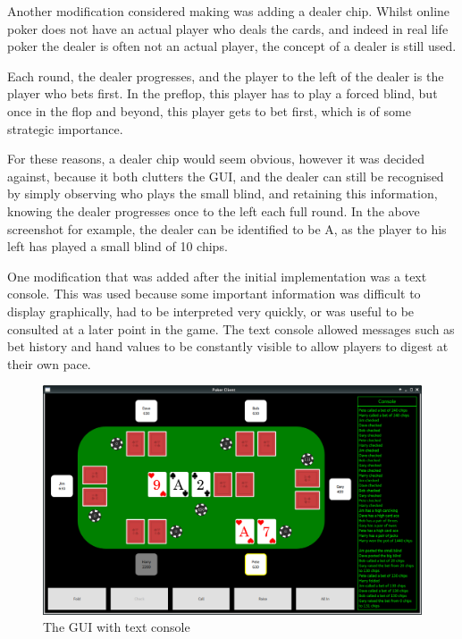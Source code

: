 Another modification considered making was adding a dealer chip. Whilst
online poker does not have an actual player who deals the cards, and indeed
in real life poker the dealer is often not an actual player, the concept of
a dealer is still used.

Each round, the dealer progresses, and the player to
the left of the dealer is the player who bets first. In the preflop, this
player has to play a forced blind, but once in the flop and beyond, this player
gets to bet first, which is of some strategic importance. 

For these reasons, a dealer chip would seem obvious, however it was decided
against, because it both clutters the GUI, and the dealer can still be
recognised by simply observing who plays the small blind, and retaining this
information, knowing the dealer progresses once to the left each full round.
In the above screenshot for example, the dealer can be identified to be A,
as the player to his left has played a small blind of 10 chips.

One modification that was added after the initial implementation was a text
console. This was used because some important information was difficult to 
display graphically, had to be interpreted very quickly, or was useful to be 
consulted at a later point in the game. The text console allowed messages such 
as bet history and hand values to be constantly visible to allow players to 
digest at their own pace.

\begin{figure}[h]
    \centering
    \includegraphics[width=\textwidth]{../images/guiwithconsole.png}
    \caption{The GUI with text console}%
    \label{fig:guiwithconsole}
\end{figure}
